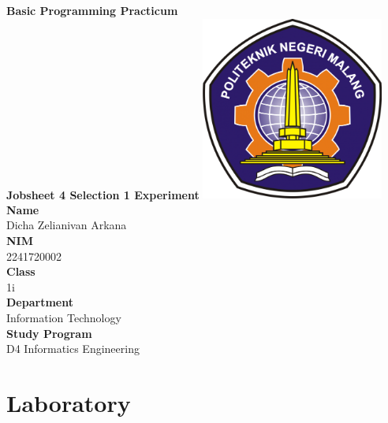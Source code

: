 \documentclass[12pt,titlepage]{article}
\newcommand{\vSubject}{Basic Programming Practicum}
\newcommand{\vSubtitle}{Jobsheet 4 Selection 1 Experiment}
\newcommand{\vName}{Dicha Zelianivan Arkana}
\newcommand{\vNIM}{2241720002}
\newcommand{\vClass}{1i}
\newcommand{\vDepartment}{Information Technology}
\newcommand{\vStudyProgram}{D4 Informatics Engineering}
\begin{document}
\begin{titlepage}
    \centering
    \vfill
    {\bfseries\LARGE
        \vSubject\\
        \vskip0.25cm
        \vSubtitle
    }
    \vfill
    \includegraphics[width=6cm]{images/polinema-logo.png}
    \vfill
    {
        \textbf{Name}\\
        \vName\\
        \vskip0.5cm
        \textbf{NIM}\\
        \vNIM\\
        \vskip0.5cm
        \textbf{Class}\\
        \vClass\\
        \vskip0.5cm
        \textbf{Department}\\
        \vDepartment\\
        \vskip0.5cm
        \textbf{Study Program}\\
        \vStudyProgram
    }
\end{titlepage}

\section{Laboratory}
\end{document}
